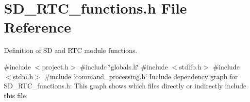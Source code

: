 \section{S\+D\+\_\+\+R\+T\+C\+\_\+functions.\+h File Reference}
\label{_s_d___r_t_c__functions_8h}


Definition of SD and R\+TC module functions.  


{\ttfamily \#include $<$project.\+h$>$}\newline
{\ttfamily \#include \char`\"{}globals.\+h\char`\"{}}\newline
{\ttfamily \#include $<$stdlib.\+h$>$}\newline
{\ttfamily \#include $<$stdio.\+h$>$}\newline
{\ttfamily \#include \char`\"{}command\+\_\+processing.\+h\char`\"{}}\newline
Include dependency graph for S\+D\+\_\+\+R\+T\+C\+\_\+functions.\+h\+:
This graph shows which files directly or indirectly include this file\+:
